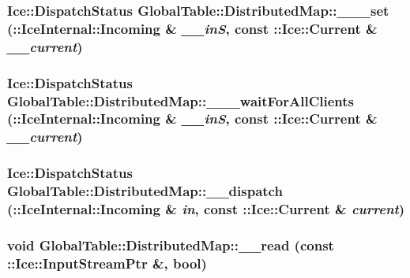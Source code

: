 \label{class_global_table_1_1_distributed_map_ad4122b38aa7a4fd717eb67c0bb94e209}
\hypertarget{class_global_table_1_1_distributed_map_a936c60bcc14ff6df79444825a45262a6}{
\subsubsection[{\_\-\_\-\_\-set}]{\setlength{\rightskip}{0pt plus 5cm}Ice::DispatchStatus GlobalTable::DistributedMap::\_\-\_\-\_\-set (::IceInternal::Incoming \& {\em \_\-\_\-inS}, \/  const ::Ice::Current \& {\em \_\-\_\-current})}}
\label{class_global_table_1_1_distributed_map_a936c60bcc14ff6df79444825a45262a6}
\hypertarget{class_global_table_1_1_distributed_map_addf6be4bfe092e27935eba59a1b61dcb}{
\subsubsection[{\_\-\_\-\_\-waitForAllClients}]{\setlength{\rightskip}{0pt plus 5cm}Ice::DispatchStatus GlobalTable::DistributedMap::\_\-\_\-\_\-waitForAllClients (::IceInternal::Incoming \& {\em \_\-\_\-inS}, \/  const ::Ice::Current \& {\em \_\-\_\-current})}}
\label{class_global_table_1_1_distributed_map_addf6be4bfe092e27935eba59a1b61dcb}
\hypertarget{class_global_table_1_1_distributed_map_a759c073848cc37b788357c0ce5115119}{
\subsubsection[{\_\-\_\-dispatch}]{\setlength{\rightskip}{0pt plus 5cm}Ice::DispatchStatus GlobalTable::DistributedMap::\_\-\_\-dispatch (::IceInternal::Incoming \& {\em in}, \/  const ::Ice::Current \& {\em current})}}
\label{class_global_table_1_1_distributed_map_a759c073848cc37b788357c0ce5115119}
\hypertarget{class_global_table_1_1_distributed_map_aad7fc00a443c0ded6693678f41683892}{
\subsubsection[{\_\-\_\-read}]{\setlength{\rightskip}{0pt plus 5cm}void GlobalTable::DistributedMap::\_\-\_\-read (const ::Ice::InputStreamPtr \&, \/  bool)}}

